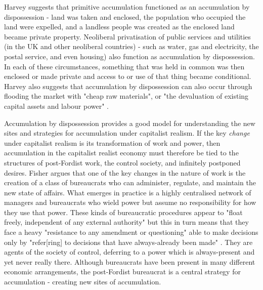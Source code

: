 Harvey suggests that primitive accumulation functioned as an accumulation by dispossession - land was taken and enclosed, the population who occupied the land were expelled, and a landless people was created as the enclosed land became private property. Neoliberal privatisation of public services and utilities (in the UK and other neoliberal countries) - such as water, gas and electricity, the postal service, and even housing) also function as accumulation by dispossession. In each of these circumstances, something that was held in common was then enclosed or made private and access to or use of that thing became conditional. Harvey also suggests that accumulation by dispossession can also occur through flooding the market with "cheap raw materials", or "the devaluation of existing capital assets and labour power" \citep[150]{harvey_new_2003}.

Accumulation by dispossession provides a good model for understanding the new sites and strategies for accumulation under capitalist realism. If the key \emph{change} under capitalist realism is its transformation of work and power, then accumulation in the capitalist realist economy must therefore be tied to the structures of post-Fordist work, the control society, and infinitely postponed desires. Fisher argues that one of the key changes in the nature of work is the creation of a class of bureaucrats who can administer, regulate, and maintain the new state of affairs. What emerges in practice is a highly centralised network of managers and bureaucrats who wield power but assume no responsibility for how they use that power. These kinds of bureaucratic procedures appear to "float freely, independent of any external authority" but this in turn means that they face a heavy "resistance to any amendment or questioning" \citep[55]{fisher_capitalist_2009} able to make decisions only by "refer[ring] to decisions that have always-already been made" \citep[53]{fisher_capitalist_2009}. They are agents of the society of control, deferring to a power which is always-present and yet never really there. Although bureaucrats have been present in many different economic arrangements, the post-Fordist bureaucrat is a central strategy for accumulation - creating new sites of accumulation.

